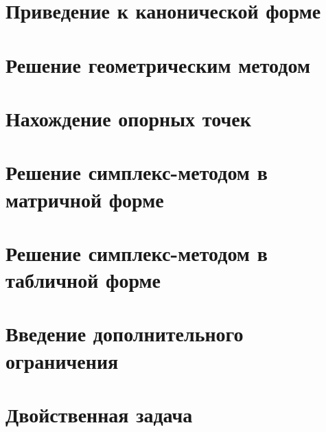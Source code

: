 \section{Приведение к канонической форме}

\section{Решение геометрическим методом}

\section{Нахождение опорных точек}

\section{Решение симплекс-методом в матричной форме}

\section{Решение симплекс-методом в табличной форме}

\section{Введение дополнительного ограничения}

\section{Двойственная задача}

